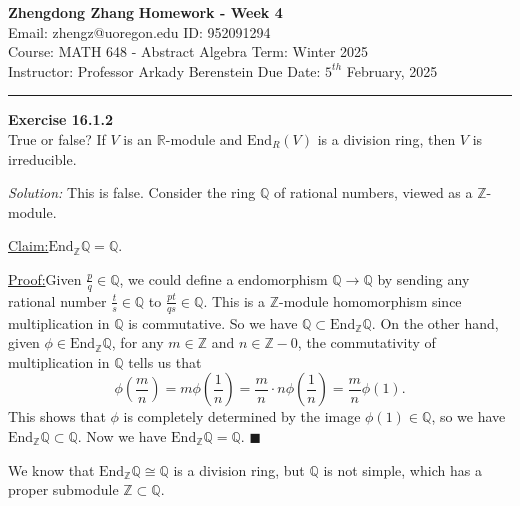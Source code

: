 \documentclass[a4paper, 12pt]{article}
\newenvironment{problem}[2][Exercise]
    { \begin{mdframed}[backgroundcolor=gray!20] \textbf{#1 #2} \\}
    {  \end{mdframed}}
\newenvironment{solution}
    {\textit{Solution:}}
    {}
\newenvironment{claim}[1]{\par\noindent\underline{Claim:}\space#1}{}
\newenvironment{claimproof}[1]{\par\noindent\underline{Proof:}\space#1}{\hfill $\blacksquare$}
\newcommand{\End}{\text{End}}
\begin{document}
\noindent
\large\textbf{Zhengdong Zhang} \hfill \textbf{Homework - Week 4}   \\
Email: zhengz@uoregon.edu \hfill ID: 952091294 \\
\normalsize Course: MATH 648 - Abstract Algebra  \hfill Term: Winter 2025\\
Instructor: Professor Arkady Berenstein \hfill Due Date: $5^{th}$ February, 2025 \\
\noindent\rule{7in}{2.8pt}
\begin{problem}{16.1.2}
True or false? If \(V\) is an \(\mathbb{R}\)-module and \(\End_R(V)\) is a division ring, then \(V\) is irreducible.
\end{problem}
\begin{solution}
This is false. Consider the ring \(\mathbb{Q}\) of rational numbers, viewed as a \(\mathbb{Z}\)-module. 
\begin{claim}
\(\End_{\mathbb{Z}}\mathbb{Q}=\mathbb{Q}\).
\end{claim}
\begin{claimproof}
Given \(\frac{p}{q}\in \mathbb{Q}\), we could define a endomorphism \(\mathbb{Q}\rightarrow \mathbb{Q}\) by sending any rational number \(\frac{t}{s}\in \mathbb{Q}\) to 
\(\frac{pt}{qs}\in \mathbb{Q}\). This is a \(\mathbb{Z}\)-module homomorphism since multiplication in \(\mathbb{Q}\) is commutative. So we have \(\mathbb{Q}\subset \End_{\mathbb{Z}}\mathbb{Q}\). 
On the other hand, given \(\phi\in \End_{\mathbb{Z}}\mathbb{Q}\), for any \(m\in \mathbb{Z}\) and \(n\in \mathbb{Z}-0\), the commutativity of multiplication in \(\mathbb{Q}\) tells us that 
\[\phi(\frac{m}{n})=m\phi(\frac{1}{n})=\frac{m}{n}\cdot n\phi(\frac{1}{n})=\frac{m}{n}\phi(1).\]
This shows that \(\phi\) is completely determined by the image \(\phi(1)\in \mathbb{Q}\), so we have \(\End_{\mathbb{Z}}\mathbb{Q}\subset \mathbb{Q}\). Now we have \(\End_{\mathbb{Z}}\mathbb{Q}=\mathbb{Q}\).
\end{claimproof}

We know that \(\End_{\mathbb{Z}}\mathbb{Q}\cong \mathbb{Q}\) is a division ring, but \(\mathbb{Q}\) is not simple, which has a proper submodule \(\mathbb{Z}\subset \mathbb{Q}\).
\end{solution}
\end{document}
